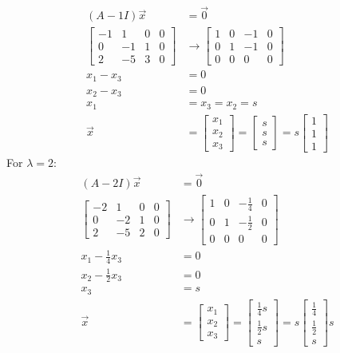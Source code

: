 \documentclass{math}
\begin{document}
\begin{align*}
  (A-1I)\vec{x} &= \vec{0} \\
  \begin{bmatrix}
    -1 & 1 & 0 & 0 \\
    0 & -1 & 1 & 0 \\
    2 & -5 & 3 & 0
  \end{bmatrix} &\to \begin{bmatrix}
    1 & 0 & -1 & 0 \\
    0 & 1 & -1 & 0 \\
    0 & 0 & 0 & 0
  \end{bmatrix} \\
  x_1-x_3 &= 0 \\
  x_2-x_3 &= 0 \\
  x_1 &= x_3 = x_2 = s \\
  \vec{x} &= \begin{bmatrix}
    x_1 \\ x_2 \\ x_3
  \end{bmatrix} = \begin{bmatrix}
    s \\ s \\ s
  \end{bmatrix} = s\begin{bmatrix}
    1 \\ 1 \\ 1
  \end{bmatrix}
\end{align*}
For \( \lambda = 2 \):
\begin{align*}
  (A-2I)\vec{x} &= \vec{0} \\
  \begin{bmatrix}
    -2 & 1 & 0 & 0 \\
    0 & -2 & 1 & 0 \\
    2 & -5 & 2 & 0
  \end{bmatrix} &\to \begin{bmatrix}
    1 & 0 & -\frac{1}{4} & 0 \\
    0 & 1 & -\frac{1}{2} & 0 \\
    0 & 0 & 0 & 0
  \end{bmatrix} \\
  x_1-\frac{1}{4}x_3 &= 0 \\
  x_2-\frac{1}{2}x_3 &= 0 \\
  x_3 &= s \\
  \vec{x} &= \begin{bmatrix}
    x_1 \\ x_2 \\ x_3
  \end{bmatrix} = \begin{bmatrix}
    \frac{1}{4}s \\ \frac{1}{2}s \\ s
  \end{bmatrix} = s\begin{bmatrix}
    \frac{1}{4} \\ \frac{1}{2} \\ s
  \end{bmatrix}s
\end{align*}
\end{document}

